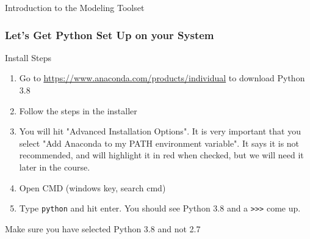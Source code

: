 \documentclass[handout, 11pt]{beamer}
\begin{document}
\begin{section}{Introduction to the Modeling Toolset}
\begin{frame}
\frametitle{Let's Get Python Set Up on your System}
{
\begin{block}{Install Steps}
\small
\begin{enumerate}
\item Go to \textcolor{blue}{\underline{\url{https://www.anaconda.com/products/individual}}} to download Python 3.8
\item Follow the steps in the installer
\item You will hit "Advanced Installation Options". It is very important that you select "Add Anaconda to my PATH environment variable". It says it is not recommended, and will highlight it in red when checked, but we will need it later in the course.
\item Open CMD (windows key, search cmd)
\item Type \texttt{python} and hit enter. You should see Python 3.8 and a \texttt{>>>} come up.
\end{enumerate}
\vfill
\end{block}
}
\begin{alertblock}{}
Make sure you have selected Python 3.8 and not 2.7
\end{alertblock}
\end{frame}
\end{section}
\end{document}
